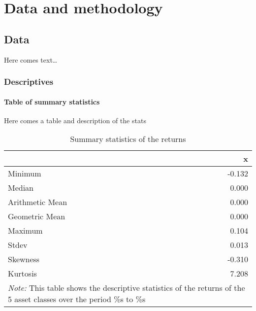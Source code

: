 \documentclass[a4paper,nobind]{templates/ociamthesis}
\begin{document}
\setlength{\textbaselineskip}{22pt plus2pt}

\setlength{\parskip}{2pt plus 1pt}

\setlength{\baselineskip}{\textbaselineskip}

\hypertarget{dat-and-meth}{%
\chapter{Data and methodology}\label{dat-and-meth}}


\minitoc 

\hypertarget{data}{%
\section{Data}\label{data}}

Here comes text\ldots{}

\hypertarget{descriptives}{%
\subsection{Descriptives}\label{descriptives}}

\hypertarget{table-of-summary-statistics}{%
\subsubsection{Table of summary statistics}\label{table-of-summary-statistics}}

Here comes a table and description of the stats

\begin{table}[h!]

\caption{\label{tab:dsTable}Summary statistics of the returns}
\centering
\begin{tabular}[t]{lr}
\toprule
  & x\\
\midrule
Minimum & -0.132\\
Median & 0.000\\
Arithmetic Mean & 0.000\\
Geometric Mean & 0.000\\
Maximum & 0.104\\
\addlinespace
Stdev & 0.013\\
Skewness & -0.310\\
Kurtosis & 7.208\\
\bottomrule
\multicolumn{2}{l}{\rule{0pt}{1em}\textit{Note: } This table shows the descriptive statistics of the returns of the 5 asset classes over the period \%s to \%s}\\
\end{tabular}
\end{table}
\end{document}
